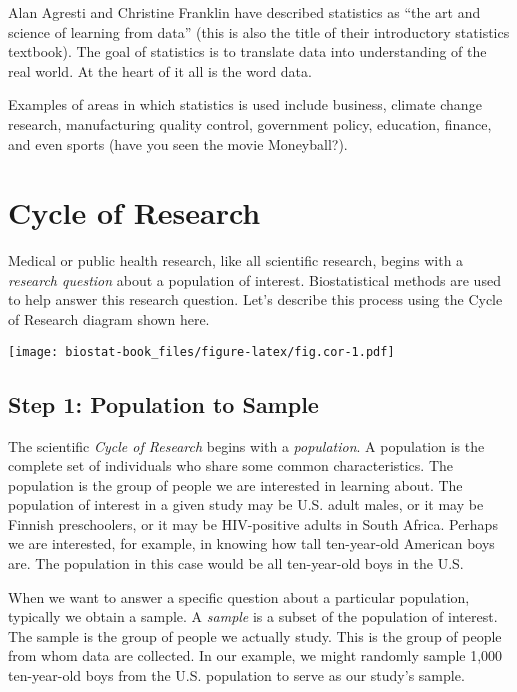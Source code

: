 \documentclass[
]{book}
\begin{document}
Alan Agresti and Christine Franklin have described statistics as ``the art and science of learning from data'' (this is also the title of their introductory statistics textbook). The goal of statistics is to translate data into understanding of the real world. At the heart of it all is the word data.

Examples of areas in which statistics is used include business, climate change research, manufacturing quality control, government policy, education, finance, and even sports (have you seen the movie Moneyball?).

\hypertarget{cycle-of-research}{%
\section{Cycle of Research}\label{cycle-of-research}}

Medical or public health research, like all scientific research, begins with a \emph{research question} about a population of interest. Biostatistical methods are used to help answer this research question. Let's describe this process using the Cycle of Research diagram shown here.

\texttt{[image: biostat-book\_files/figure-latex/fig.cor-1.pdf]}

\hypertarget{step-1-population-to-sample}{%
\subsection{Step 1: Population to Sample}\label{step-1-population-to-sample}}

The scientific \emph{Cycle of Research} begins with a \emph{population}. A population is the complete set of individuals who share some common characteristics. The population is the group of people we are interested in learning about. The population of interest in a given study may be U.S. adult males, or it may be Finnish preschoolers, or it may be HIV-positive adults in South Africa. Perhaps we are interested, for example, in knowing how tall ten-year-old American boys are. The population in this case would be all ten-year-old boys in the U.S.

When we want to answer a specific question about a particular population, typically we obtain a sample. A \emph{sample} is a subset of the population of interest. The sample is the group of people we actually study. This is the group of people from whom data are collected. In our example, we might randomly sample 1,000 ten-year-old boys from the U.S. population to serve as our study's sample.
\end{document}
